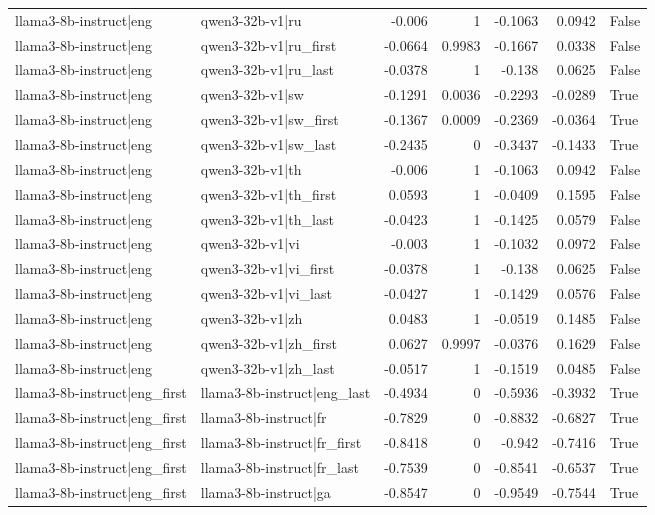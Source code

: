 \begin{table}
\begin{tabular}{l l r r r r l}
llama3-8b-instruct|eng & qwen3-32b-v1|ru & -0.006 & 1 & -0.1063 & 0.0942 & False \\
llama3-8b-instruct|eng & qwen3-32b-v1|ru_first & -0.0664 & 0.9983 & -0.1667 & 0.0338 & False \\
llama3-8b-instruct|eng & qwen3-32b-v1|ru_last & -0.0378 & 1 & -0.138 & 0.0625 & False \\
llama3-8b-instruct|eng & qwen3-32b-v1|sw & -0.1291 & 0.0036 & -0.2293 & -0.0289 & True \\
llama3-8b-instruct|eng & qwen3-32b-v1|sw_first & -0.1367 & 0.0009 & -0.2369 & -0.0364 & True \\
llama3-8b-instruct|eng & qwen3-32b-v1|sw_last & -0.2435 & 0 & -0.3437 & -0.1433 & True \\
llama3-8b-instruct|eng & qwen3-32b-v1|th & -0.006 & 1 & -0.1063 & 0.0942 & False \\
llama3-8b-instruct|eng & qwen3-32b-v1|th_first & 0.0593 & 1 & -0.0409 & 0.1595 & False \\
llama3-8b-instruct|eng & qwen3-32b-v1|th_last & -0.0423 & 1 & -0.1425 & 0.0579 & False \\
llama3-8b-instruct|eng & qwen3-32b-v1|vi & -0.003 & 1 & -0.1032 & 0.0972 & False \\
llama3-8b-instruct|eng & qwen3-32b-v1|vi_first & -0.0378 & 1 & -0.138 & 0.0625 & False \\
llama3-8b-instruct|eng & qwen3-32b-v1|vi_last & -0.0427 & 1 & -0.1429 & 0.0576 & False \\
llama3-8b-instruct|eng & qwen3-32b-v1|zh & 0.0483 & 1 & -0.0519 & 0.1485 & False \\
llama3-8b-instruct|eng & qwen3-32b-v1|zh_first & 0.0627 & 0.9997 & -0.0376 & 0.1629 & False \\
llama3-8b-instruct|eng & qwen3-32b-v1|zh_last & -0.0517 & 1 & -0.1519 & 0.0485 & False \\
llama3-8b-instruct|eng_first & llama3-8b-instruct|eng_last & -0.4934 & 0 & -0.5936 & -0.3932 & True \\
llama3-8b-instruct|eng_first & llama3-8b-instruct|fr & -0.7829 & 0 & -0.8832 & -0.6827 & True \\
llama3-8b-instruct|eng_first & llama3-8b-instruct|fr_first & -0.8418 & 0 & -0.942 & -0.7416 & True \\
llama3-8b-instruct|eng_first & llama3-8b-instruct|fr_last & -0.7539 & 0 & -0.8541 & -0.6537 & True \\
llama3-8b-instruct|eng_first & llama3-8b-instruct|ga & -0.8547 & 0 & -0.9549 & -0.7544 & True \\

\end{tabular}
\end{table}
